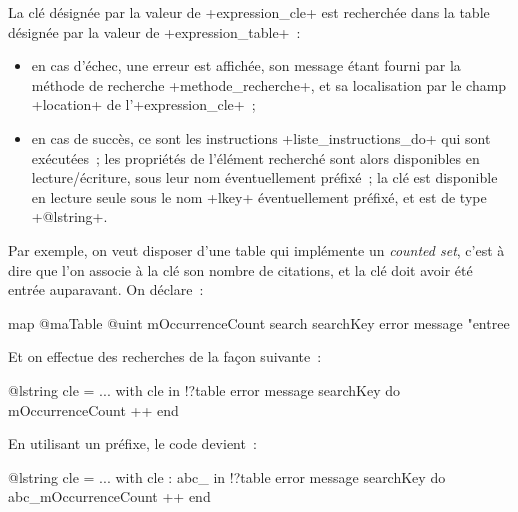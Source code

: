 La clé désignée par la valeur de \ggst+expression_cle+ est recherchée dans la table désignée par la valeur de \ggst+expression_table+~:
\begin{itemize}
  \item en cas d'échec, une erreur est affichée, son message étant fourni par la méthode de recherche \ggst+methode_recherche+, et sa localisation par le champ \ggst+location+ de l'\ggst+expression_cle+~;
  \item en cas de succès, ce sont les instructions \ggst+liste_instructions_do+ qui sont exécutées~; les propriétés de l'élément recherché sont alors disponibles en lecture/écriture, sous leur nom éventuellement préfixé~; la clé est disponible en lecture seule sous le nom \ggst+lkey+ éventuellement préfixé, et est de type \ggst+@lstring+.
\end{itemize}

Par exemple, on veut disposer d'une table qui implémente un \emph{counted set}, c'est à dire que l'on associe à la clé son nombre de citations, et la clé doit avoir été entrée auparavant. On déclare~:
\begin{galgas3}
map @maTable {
  @uint mOccurrenceCount
  search searchKey error message "entree %
}
\end{galgas3}

Et on effectue des recherches de la façon suivante~:
\begin{galgas3}
@lstring cle = ...
with cle in !?table error message searchKey do
  mOccurrenceCount ++
end
\end{galgas3}

En utilisant un préfixe, le code devient~:
\begin{galgas3}
@lstring cle = ...
with cle : abc_ in !?table error message searchKey do
  abc_mOccurrenceCount ++
end
\end{galgas3}

